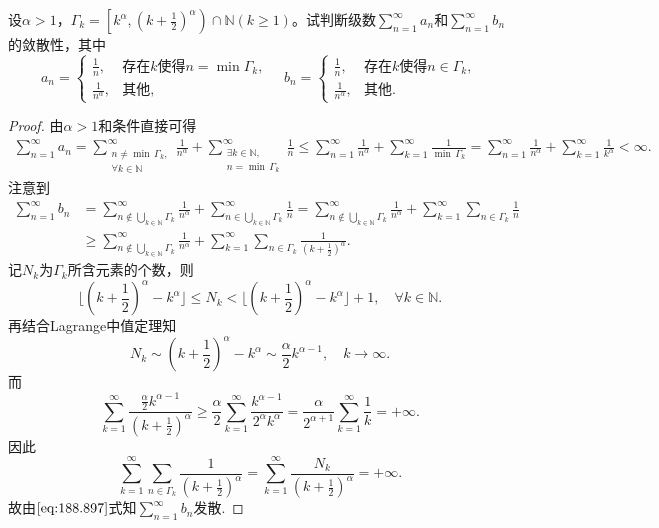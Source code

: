\documentclass[../../main.tex]{subfiles}%
\begin{document}
\begin{example}
设$\alpha > 1$，$\Gamma_k = \left[ k^\alpha, \left( k + \frac{1}{2} \right)^\alpha \right) \cap \mathbb{N} (k \geqslant 1)$。试判断级数$\sum\limits_{n=1}^{\infty} a_n$和$\sum\limits_{n=1}^{\infty} b_n$的敛散性，其中
$$a_n = \begin{cases}
\frac{1}{n}, & \text{存在} k \text{使得} n = \min \Gamma_k, \\
\frac{1}{n^\alpha}, & \text{其他},
\end{cases} \quad b_n = \begin{cases}
\frac{1}{n}, & \text{存在} k \text{使得} n \in \Gamma_k, \\
\frac{1}{n^\alpha}, & \text{其他}.
\end{cases}$$
\end{example}
\begin{proof}

由$\alpha >1$和条件直接可得
\begin{align*}
\sum\limits_{n=1}^{\infty}a_n=
\sum\limits_{\substack{n\ne \min\,\Gamma_k,\\\forall k\in \mathbb{N}}}^{\infty}\frac{1}{n^{\alpha}}+
\sum\limits_{\substack{\exists k\in \mathbb{N},\\n=\min\,\Gamma_k}}^{\infty}\frac{1}{n}
\leqslant \sum\limits_{n=1}^{\infty}\frac{1}{n^{\alpha}}+
\sum\limits_{k=1}^{\infty}\frac{1}{\min\,\Gamma_k}=
\sum\limits_{n=1}^{\infty}\frac{1}{n^{\alpha}}+
\sum\limits_{k=1}^{\infty}\frac{1}{k^{\alpha}}<\infty.
\end{align*}
注意到
\begin{align}
\sum\limits_{n=1}^{\infty}{b_n}&=\sum\limits_{n\notin \bigcup_{k\in \mathbb{N}}{\Gamma _k}}^{\infty}{\frac{1}{n^{\alpha}}}+\sum\limits_{n\in \bigcup_{k\in \mathbb{N}}{\Gamma _k}}^{\infty}{\frac{1}{n}}=\sum\limits_{n\notin \bigcup_{k\in \mathbb{N}}{\Gamma _k}}^{\infty}{\frac{1}{n^{\alpha}}}+\sum\limits_{k=1}^{\infty}{\sum\limits_{n\in \Gamma _k}{\frac{1}{n}}}
\nonumber \\
&\geqslant \sum\limits_{n\notin \bigcup_{k\in \mathbb{N}}{\Gamma _k}}^{\infty}{\frac{1}{n^{\alpha}}}+\sum\limits_{k=1}^{\infty}{\sum\limits_{n\in \Gamma _k}{\frac{1}{\left( k+\frac{1}{2} \right) ^{\alpha}}}}.\label{eq:188.897}
\end{align}
记$N_k$为$\Gamma_k$所含元素的个数，则
$$\lfloor \left( k+\frac{1}{2} \right) ^{\alpha}-k^{\alpha} \rfloor \leqslant N_k<\lfloor \left( k+\frac{1}{2} \right) ^{\alpha}-k^{\alpha} \rfloor +1,\quad \forall k\in \mathbb{N} .$$
再结合Lagrange中值定理知
$$N_k\sim \left( k+\frac{1}{2} \right) ^{\alpha}-k^{\alpha}\sim \frac{\alpha}{2}k^{\alpha -1},\quad k\rightarrow \infty .$$
而
$$\sum\limits_{k=1}^{\infty}{\frac{\frac{\alpha}{2}k^{\alpha -1}}{\left( k+\frac{1}{2} \right) ^{\alpha}}}\geqslant \frac{\alpha}{2}\sum\limits_{k=1}^{\infty}{\frac{k^{\alpha -1}}{2^{\alpha}k^{\alpha}}}=\frac{\alpha}{2^{\alpha +1}}\sum\limits_{k=1}^{\infty}{\frac{1}{k}}=+\infty .$$
因此
$$\sum\limits_{k=1}^{\infty}{\sum\limits_{n\in \Gamma _k}{\frac{1}{\left( k+\frac{1}{2} \right) ^{\alpha}}}}=\sum\limits_{k=1}^{\infty}{\frac{N_k}{\left( k+\frac{1}{2} \right) ^{\alpha}}}=+\infty .$$
故由$\eqref{eq:188.897}$式知$\sum\limits_{n=1}^{\infty}{b_n}$发散.

\end{proof}
\end{document}
